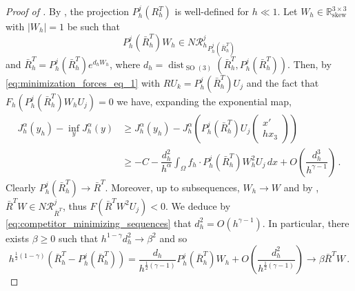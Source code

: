 \documentclass{article}
\theoremstyle{plain}
\theoremstyle{plain}
\theoremstyle{plain}
\theoremstyle{plain}
\theoremstyle{plain}
\theoremstyle{definition}
\theoremstyle{definition}
\renewcommand{\r}{\mathbb{R}}
\DeclareMathOperator{\SO}{SO}
\DeclareMathOperator{\skw}{skew}
\DeclareMathOperator{\dist}{dist}
\begin{document}
\begin{proof}[Proof of ]
	By , the projection $P_h^j(R_h^T)$ is well-defined for $h \ll 1$. Let $W_h \in \r^{3 \times 3}_{\skw}$ with $|W_h| = 1$ be such that
	\[
		P^j_h(\bar R_h^T) W_h \in N\mathcal{R}_h^j{}_{P_h^j(\bar R_h^T)}
	\]
	 and $\bar R_h^T = P_h^j(\bar R_h^T)e^{d_h W_h}$, where $d_h = \dist_{\SO(3)}(\bar R_h^T, P_h^j(\bar R_h^T))$. Then, by \eqref{eq:minimization_forces_eq_1} with $RU_k = P_h^j(\bar R_h^T)U_j$ and the fact that $F_h(P_h^j(\bar R_h^T)W_hU_j) = 0$ we have, expanding the exponential map,
	\begin{equation}\label{eq:competitor_minimizing_sequences}
		\begin{aligned}
				J_h^\alpha(y_h) - \inf_y J_h^\alpha(y) & \geq J_h^\alpha(y_h) - J_h^\alpha\left(P_h^j(\bar R_h^T)U_j \begin{pmatrix}
			x' \\ hx_3
			\end{pmatrix}\right) \\
			& \geq -C -\dfrac{d_h^2}{h^\alpha} \int_\Omega f_h \cdot P_h^j(\bar R_h^T) W_h^2 U_j \, dx + O\left(\dfrac{d_h^3}{h^{\gamma-1}}\right) \,.
		\end{aligned}
	\end{equation}
	Clearly $P_h^j(\bar R_h^T) \to \bar R^T$. Moreover, up to subsequences, $W_h \to W$ and by , $\bar R^T W \in N \mathcal{R}^j_{\bar R^T}$, thus $F(\bar R^TW^2 U_j) < 0$. We deduce by \eqref{eq:competitor_minimizing_sequences} that $d_h^2 = O(h^{\gamma - 1})$. In particular, there exists $\beta \geq 0$ such that $h^{1-\gamma}d_h^2 \to \beta^2$ and so 
	\[
		h^{\frac{1}{2}(1-\gamma)}(\bar R_h^T - P^j_h(\bar R_h^T)) = \dfrac{d_h}{h^{\frac{1}{2}(\gamma-1)}}P_h^j(\bar R_h^T)W_h + O\left(\dfrac{d_h^2}{h^{\frac{1}{2}(\gamma-1)}}\right) \to \beta \bar R^T W \,.
	\]


\end{proof}
\end{document}
